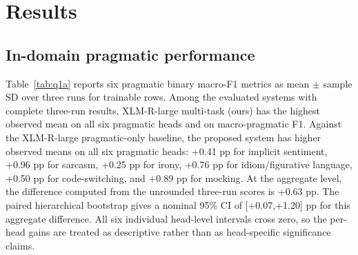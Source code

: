 \section{Results}

\subsection{In-domain pragmatic performance}
Table~\ref{tab:q1a} reports six pragmatic binary macro-F1 metrics as mean $\pm$ sample SD over three runs for trainable rows. Among the evaluated systems with complete three-run results, XLM-R-large multi-task (ours) has the highest observed mean on all six pragmatic heads and on macro-pragmatic F1. Against the XLM-R-large pragmatic-only baseline, the proposed system has higher observed means on all six pragmatic heads: +0.41 pp for implicit sentiment, +0.96 pp for sarcasm, +0.25 pp for irony, +0.76 pp for idiom/figurative language, +0.50 pp for code-switching, and +0.89 pp for mocking. At the aggregate level, the difference computed from the unrounded three-run scores is +0.63 pp. The paired hierarchical bootstrap gives a nominal 95\% CI of [+0.07,+1.20] pp for this aggregate difference. All six individual head-level intervals cross zero, so the per-head gains are treated as descriptive rather than as head-specific significance claims.


